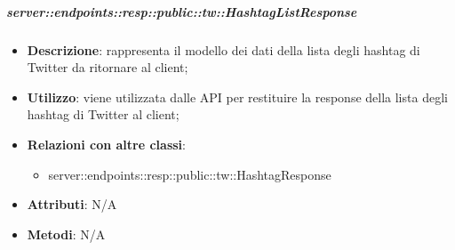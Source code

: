     \subparagraph{server::endpoints::resp::public::tw::HashtagListResponse} %
    \label{subp:bdsm_app_server_endpoints_resp_public_tw_hashtaglistresponse}
    \begin{itemize}
      \item \textbf{Descrizione}: rappresenta il modello dei dati della lista degli hashtag di Twitter da ritornare al client;
      \item \textbf{Utilizzo}: viene utilizzata dalle API per restituire la response della lista degli hashtag di Twitter al client;
      \item \textbf{Relazioni con altre classi}:
        \begin{itemize}
          \item server::endpoints::resp::public::tw::HashtagResponse
        \end{itemize}
	  \item \textbf{Attributi}: N/A
	  \item \textbf{Metodi}: N/A
      \end{itemize}

